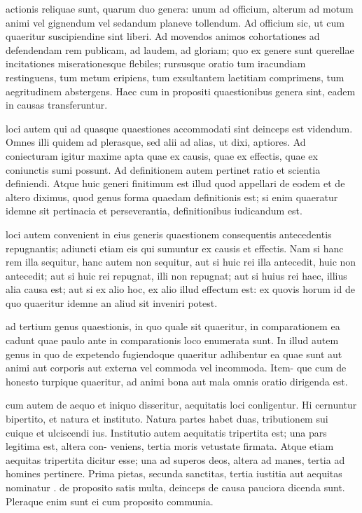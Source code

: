  actionis reliquae sunt, quarum duo genera: unum ad officium, alterum ad motum animi vel gignendum vel sedandum planeve tollendum. Ad officium sic, ut cum quaeritur suscipiendine sint liberi. Ad movendos animos cohortationes ad defendendam rem publicam, ad laudem, ad gloriam; quo ex genere sunt querellae incitationes miserationesque flebiles; rursusque oratio tum iracundiam restinguens, tum metum eripiens, tum exsultantem laetitiam comprimens, tum aegritudinem abstergens. Haec cum in propositi quaestionibus genera sint, eadem in causas transferuntur.

 loci autem qui ad quasque quaestiones accommodati sint deinceps est videndum. Omnes illi quidem ad plerasque, sed alii ad alias, ut dixi, aptiores. Ad coniecturam igitur maxime apta quae ex causis, quae ex effectis, quae ex coniunctis sumi possunt. Ad definitionem autem pertinet ratio et scientia definiendi. Atque huic generi finitimum est illud quod appellari de eodem et de altero diximus, quod genus forma quaedam definitionis est; si enim quaeratur idemne sit pertinacia et perseverantia, definitionibus iudicandum est.

 loci autem convenient in eius generis quaestionem consequentis antecedentis repugnantis; adiuncti etiam eis qui sumuntur ex causis et effectis. Nam si hanc rem illa sequitur, hanc autem non sequitur, aut si huic rei illa antecedit, huic non antecedit; aut si huic rei repugnat, illi non repugnat; aut si huius rei haec, illius alia causa est; aut si ex alio hoc, ex alio illud effectum est: ex quovis horum id de quo quaeritur idemne an aliud sit inveniri potest.

 ad tertium genus quaestionis, in quo quale sit quaeritur, in comparationem ea cadunt quae paulo ante in comparationis loco enumerata sunt. In illud autem genus in quo de expetendo fugiendoque quaeritur adhibentur ea quae sunt aut animi aut corporis aut externa vel commoda vel incommoda. Item- que cum de honesto turpique quaeritur, ad animi bona aut mala omnis oratio dirigenda est.

 cum autem de aequo et iniquo disseritur, aequitatis loci conligentur. Hi cernuntur bipertito, et natura et instituto. Natura partes habet duas, tributionem sui cuique et ulciscendi ius. Institutio autem aequitatis tripertita est; una pars legitima est, altera con- veniens, tertia moris vetustate firmata. Atque etiam aequitas tripertita dicitur esse; una ad superos deos, altera ad manes, tertia ad homines pertinere. Prima pietas, secunda sanctitas, tertia iustitia aut aequitas nominatur . de proposito satis multa, deinceps de causa pauciora dicenda sunt. Pleraque enim sunt ei cum proposito communia.


